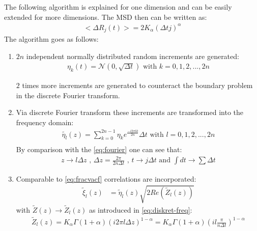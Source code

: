 \documentclass[
  a4paper,BCOR10mm,oneside,
  bibtotoc,idxtotoc,
  headsepline,footsepline,%
  fleqn,openbib
]{scrbook}
\begin{document}
 The following algorithm is explained for one dimension and can be easily extended for more dimensions. The MSD then can be written as:
\begin{align}
< \Delta R_{j}(t)>=2K_{\alpha} (\Delta t j)^{\alpha}
\end{align}
The algorithm goes as follows:
\begin{enumerate}
 \item $2 n$ independent normally distributed random increments are generated: 
\begin{align}
 \eta_k(t)= \mathcal{N}(0,\sqrt{\Delta t}) \text{  with  } k=0,1,2,...,2n
\end{align}

$2$ times more increments are generated to counteract the boundary problem in the discrete Fourier transform. 

\item Via discrete Fourier transform these increments are transformed into the frequency domain:
\begin{align}
 \tilde{\eta_l}(z)=\sum_{k=0}^{2n-1} \eta_k e^{\frac{- i 2 \pi  l k }{2n}} \Delta t   \text{  with  }  l=0,1,2,...,2n  \label{eq:fouriertrans}\\ 
\end{align}
By comparison with the \cref{eq:fourier} one can see that:
\begin{align}
 z \rightarrow  l \Delta z \text{ , } \Delta z =   \frac{2 \pi }{2n \Delta t} \text{ , } t \rightarrow j \Delta t \text{ and } \int dt \rightarrow \sum \Delta t \label{eq:diskret-freq} 
\end{align}
 
\item Comparable to \cref{eq:fracvacf} correlations are incorporated: 
 \begin{align}
   \tilde{\xi}_{l}(z)&= \tilde{\eta}_l(z) \sqrt{2 Re( \tilde{Z}_l(z))} \label{eq:corelastion} 
  \end{align}
 with $\tilde{Z}(z)\rightarrow \tilde{Z}_l(z)$ as introduced in \cref{eq:diskret-freq}:
  \begin{align}
   \tilde{Z}_l(z) = K_{\alpha} \Gamma(1+\alpha)(i 2 \pi l \Delta z)^{1-\alpha} =  K_{\alpha} \Gamma(1+\alpha)(i l \frac{ \pi}{n \Delta t})^{1-\alpha} 
 \end{align}
 

\end{enumerate}
\end{document}
